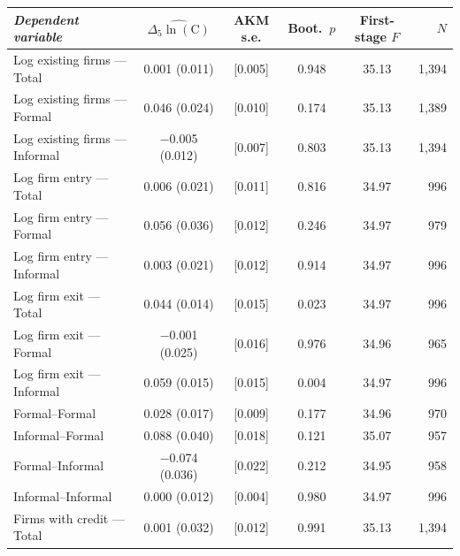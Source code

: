 \begin{threeparttable}
    \begin{tabular}{lccccr}
        \toprule
        \textit{Dependent variable} & $\widehat{\Delta_5\ln(\text{C})}$ & AKM s.e. & Boot.\ $p$ & First-stage $F$ & $N$ \\
        \midrule
        Log existing firms --- Total    & \phantom{$-$}0.001          (0.011) & [0.005]          & 0.948 & 35.13 & 1{,}394 \\
        Log existing firms --- Formal   & \phantom{$-$}0.046\sym{*}   (0.024) & [0.010]\sym{***} & 0.174 & 35.13 & 1{,}389 \\
        Log existing firms --- Informal & $-$0.005          (0.012) & [0.007]          & 0.803 & 35.13 & 1{,}394 \\
        Log firm entry --- Total        & \phantom{$-$}0.006          (0.021) & [0.011]          & 0.816 & 34.97 & \phantom{1{,}}996 \\
        Log firm entry --- Formal       & \phantom{$-$}0.056          (0.036) & [0.012]\sym{***} & 0.246 & 34.97 & \phantom{1{,}}979 \\
        Log firm entry --- Informal     & \phantom{$-$}0.003          (0.021) & [0.012]          & 0.914 & 34.97 & \phantom{1{,}}996 \\
        Log firm exit --- Total         & \phantom{$-$}0.044\sym{***} (0.014) & [0.015]\sym{***} & 0.023 & 34.97 & \phantom{1{,}}996 \\
        Log firm exit --- Formal        & $-$0.001          (0.025) & [0.016]          & 0.976 & 34.96 & \phantom{1{,}}965 \\
        Log firm exit --- Informal      & \phantom{$-$}0.059\sym{***} (0.015) & [0.015]\sym{***} & 0.004 & 34.97 & \phantom{1{,}}996 \\
        \midrule
        Formal--Formal                  & \phantom{$-$}0.028\sym{*}   (0.017) & [0.009]\sym{***} & 0.177 & 34.96 & \phantom{1{,}}970 \\
        Informal--Formal                & \phantom{$-$}0.088\sym{**}  (0.040) & [0.018]\sym{***} & 0.121 & 35.07 & \phantom{1{,}}957 \\
        Formal--Informal                & $-$0.074\sym{**}  (0.036) & [0.022]\sym{***} & 0.212 & 34.95 & \phantom{1{,}}958 \\
        Informal--Informal              & \phantom{$-$}0.000          (0.012) & [0.004]          & 0.980 & 34.97 & \phantom{1{,}}996 \\
        \midrule
        Firms with credit --- Total     & \phantom{$-$}0.001          (0.032) & [0.012]          & 0.991 & 35.13 & 1{,}394 \\

\end{tabular}
\end{threeparttable}
